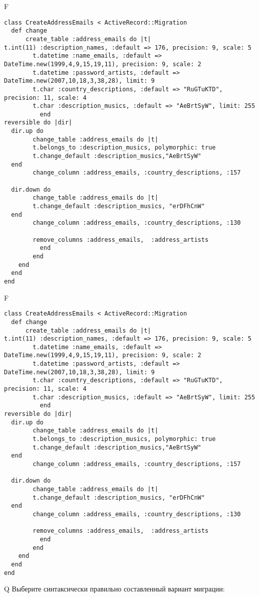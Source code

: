 F
\begin{verbatim}
class CreateAddressEmails < ActiveRecord::Migration
  def change
	  create_table :address_emails do |t|
t.int(11) :description_names, :default => 176, precision: 9, scale: 5
		t.datetime :name_emails, :default => DateTime.new(1999,4,9,15,19,11), precision: 9, scale: 2
		t.datetime :password_artists, :default => DateTime.new(2007,10,18,3,38,28), limit: 9
		t.char :country_descriptions, :default => "RuGTuKTD", precision: 11, scale: 4
		t.char :description_musics, :default => "AeBrtSyW", limit: 255
		  end
reversible do |dir|
  dir.up do
		change_table :address_emails do |t|
		t.belongs_to :description_musics, polymorphic: true
 		t.change_default :description_musics,"AeBrtSyW"
  end
 		change_column :address_emails, :country_descriptions, :157
   
  dir.down do
		change_table :address_emails do |t|
		t.change_default :description_musics, "erDFhCnW"
  end
 		change_column :address_emails, :country_descriptions, :130
   
		remove_columns :address_emails,  :address_artists 
	      end
	    end
    end 
  end
end

\end{verbatim}

F
\begin{verbatim}
class CreateAddressEmails < ActiveRecord::Migration
  def change
	  create_table :address_emails do |t|
t.int(11) :description_names, :default => 176, precision: 9, scale: 5
		t.datetime :name_emails, :default => DateTime.new(1999,4,9,15,19,11), precision: 9, scale: 2
		t.datetime :password_artists, :default => DateTime.new(2007,10,18,3,38,28), limit: 9
		t.char :country_descriptions, :default => "RuGTuKTD", precision: 11, scale: 4
		t.char :description_musics, :default => "AeBrtSyW", limit: 255
		  end
reversible do |dir|
  dir.up do
		change_table :address_emails do |t|
		t.belongs_to :description_musics, polymorphic: true
 		t.change_default :description_musics,"AeBrtSyW"
  end
 		change_column :address_emails, :country_descriptions, :157
   
  dir.down do
		change_table :address_emails do |t|
		t.change_default :description_musics, "erDFhCnW"
  end
 		change_column :address_emails, :country_descriptions, :130
   
		remove_columns :address_emails,  :address_artists 
	      end
	    end
    end 
  end
end

\end{verbatim}

Q
Выберите синтаксически правильно составленный вариант миграции:


